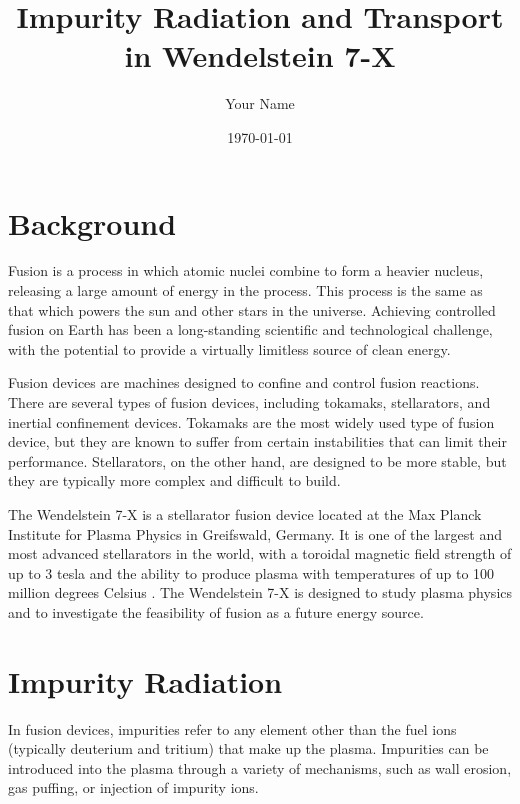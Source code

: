 \documentclass[12pt]{article}
\begin{document}
\title{Impurity Radiation and Transport in Wendelstein 7-X}

\author{Your Name}

\date{\today}

\maketitle

\section{Background}

Fusion is a process in which atomic nuclei combine to form a heavier nucleus, releasing a large amount of energy in the process. This process is the same as that which powers the sun and other stars in the universe. Achieving controlled fusion on Earth has been a long-standing scientific and technological challenge, with the potential to provide a virtually limitless source of clean energy.

Fusion devices are machines designed to confine and control fusion reactions. There are several types of fusion devices, including tokamaks, stellarators, and inertial confinement devices. Tokamaks are the most widely used type of fusion device, but they are known to suffer from certain instabilities that can limit their performance. Stellarators, on the other hand, are designed to be more stable, but they are typically more complex and difficult to build.

The Wendelstein 7-X is a stellarator fusion device located at the Max Planck Institute for Plasma Physics in Greifswald, Germany. It is one of the largest and most advanced stellarators in the world, with a toroidal magnetic field strength of up to 3 tesla and the ability to produce plasma with temperatures of up to 100 million degrees Celsius \cite{sun2017}. The Wendelstein 7-X is designed to study plasma physics and to investigate the feasibility of fusion as a future energy source.

\section{Impurity Radiation}

In fusion devices, impurities refer to any element other than the fuel ions (typically deuterium and tritium) that make up the plasma. Impurities can be introduced into the plasma through a variety of mechanisms, such as wall erosion, gas puffing, or injection of impurity ions.
\end{document}
